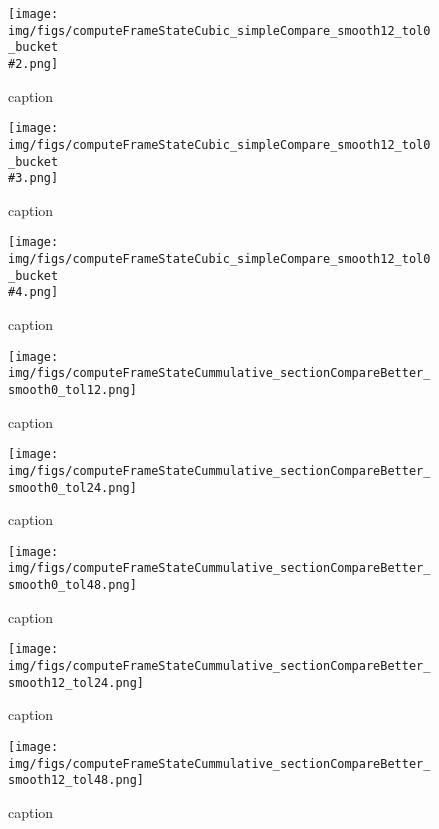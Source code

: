 %
\begin{figure}[!ht]
	\centering
	\texttt{[image: img/figs/computeFrameStateCubic\_simpleCompare\_smooth12\_tol0\_bucket\\\#2.png]}
	\caption{caption}
	\label{fig:computeFrameStateCubic_simpleCompare_smooth12_tol0_bucket\#2.png}
\end{figure}
%
\begin{figure}[!ht]
	\centering
	\texttt{[image: img/figs/computeFrameStateCubic\_simpleCompare\_smooth12\_tol0\_bucket\\\#3.png]}
	\caption{caption}
	\label{fig:computeFrameStateCubic_simpleCompare_smooth12_tol0_bucket\#3.png}
\end{figure}
%
\begin{figure}[!ht]
	\centering
	\texttt{[image: img/figs/computeFrameStateCubic\_simpleCompare\_smooth12\_tol0\_bucket\\\#4.png]}
	\caption{caption}
	\label{fig:computeFrameStateCubic_simpleCompare_smooth12_tol0_bucket\#4.png}
\end{figure}
%
\begin{figure}[!ht]
	\centering
	\texttt{[image: img/figs/computeFrameStateCummulative\_sectionCompareBetter\_smooth0\_tol12.png]}
	\caption{caption}
	\label{fig:computeFrameStateCummulative_sectionCompareBetter_smooth0_tol12.png}
\end{figure}
%
\begin{figure}[!ht]
	\centering
	\texttt{[image: img/figs/computeFrameStateCummulative\_sectionCompareBetter\_smooth0\_tol24.png]}
	\caption{caption}
	\label{fig:computeFrameStateCummulative_sectionCompareBetter_smooth0_tol24.png}
\end{figure}
%
\begin{figure}[!ht]
	\centering
	\texttt{[image: img/figs/computeFrameStateCummulative\_sectionCompareBetter\_smooth0\_tol48.png]}
	\caption{caption}
	\label{fig:computeFrameStateCummulative_sectionCompareBetter_smooth0_tol48.png}
\end{figure}
%
\begin{figure}[!ht]
	\centering
	\texttt{[image: img/figs/computeFrameStateCummulative\_sectionCompareBetter\_smooth12\_tol24.png]}
	\caption{caption}
	\label{fig:computeFrameStateCummulative_sectionCompareBetter_smooth12_tol24.png}
\end{figure}
%
\begin{figure}[!ht]
	\centering
	\texttt{[image: img/figs/computeFrameStateCummulative\_sectionCompareBetter\_smooth12\_tol48.png]}
	\caption{caption}
	\label{fig:computeFrameStateCummulative_sectionCompareBetter_smooth12_tol48.png}
\end{figure}
